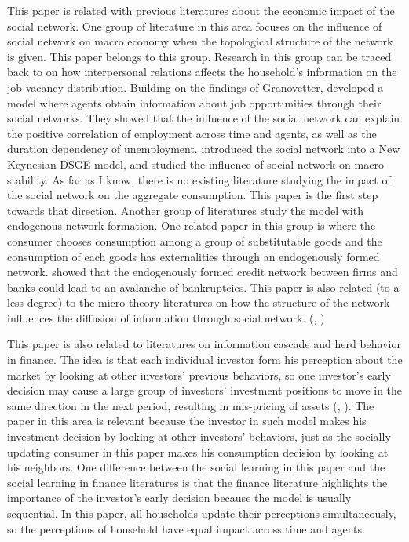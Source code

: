 \documentclass[12pt,letterpaper]{article}
\begin{document}
This paper is related with previous literatures about the economic impact of the social network. One group of literature in this area focuses on the influence of social network on macro economy when the topological structure of the network is given. This paper belongs to this group. Research in this group can be traced back to \cite{Granovetter1973} on how interpersonal relations affects the household's information on the job vacancy distribution. Building on the findings of Granovetter, \cite{VacancyNet} developed a model where agents obtain information about job opportunities through their social networks. They showed that the influence of the social network can explain the positive correlation of employment across time and agents, as well as the duration dependency of unemployment. \cite{Stability} introduced the social network into a New Keynesian DSGE model, and studied the influence of social network on macro stability. As far as I know, there is no existing literature studying the impact of the social network on the aggregate consumption. This paper is the first step towards that direction. Another group of literatures study the model with endogenous network formation. One related paper in this group is \cite{ConsumptionManage} where the consumer chooses consumption among a group of substitutable goods and the consumption of each goods has externalities through an endogenously formed network. \cite{EndogNet} showed that the endogenously formed credit network between firms and banks could lead to an avalanche of bankruptcies. This paper is also related (to a less degree) to the micro theory literatures on how the structure of the network influences the diffusion of information through social network. (\cite{MicroSurvey}, \cite{MicroStructure})\par
This paper is also related to literatures on information cascade and herd behavior in finance. The idea is that each individual investor form his perception about the market by looking at other investors' previous behaviors, so one investor's early decision may cause a large group of investors' investment positions to move in the same direction in the next period, resulting in mis-pricing of assets (\cite{HerdOrigin}, \cite{HerdUncertain}). The paper in this area is relevant because the investor in such model makes his investment decision by looking at other investors' behaviors, just as the socially updating consumer in this paper makes his consumption decision by looking at his neighbors. One difference between the social learning in this paper and the social learning in finance literatures is that the finance literature highlights the importance of the investor's early decision because the model is usually sequential. In this paper, all households update their perceptions simultaneously, so the perceptions of household have equal impact across time and agents.\par
\end{document}
